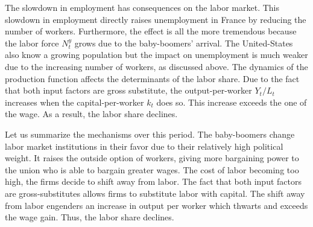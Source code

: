 The slowdown in employment has consequences on the labor market. 
This slowdown in employment directly raises unemployment in France by reducing the number of workers. Furthermore, the effect is all the more tremendous because the labor force $N_t^y$ grows due to the baby-boomers' arrival. The United-States also know a growing population but the impact on unemployment is much weaker due to the increasing number of workers, as discussed above.
The dynamics of the production function affects the determinants of the labor share. 
Due to the fact that both input factors are gross substitute, the output-per-worker $Y_t/L_t$ increases when the capital-per-worker $k_t$ does so. This increase exceeds the one of the wage. As a result, the labor share declines.

Let us summarize the mechanisms over this period. The baby-boomers change labor market institutions in their favor due to their relatively high political weight. It raises the outside option of workers, giving more bargaining power to the union who is able to bargain greater wages. The cost of labor becoming too high, the firms decide to shift away from labor. The fact that both input factors are gross-substitutes allows firms to substitute labor with capital. The shift away from labor engenders an increase in output per worker which thwarts and exceeds the wage gain. Thus, the labor share declines. %

